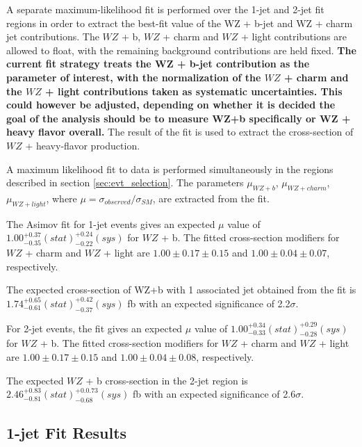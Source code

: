 
A separate maximum-likelihood fit is performed over the 1-jet and 2-jet fit regions in order to extract the best-fit value of the WZ + b-jet and WZ + charm jet contributions. The $WZ$ + b, $WZ$ + charm and $WZ$ + light contributions are allowed to float, with the remaining background contributions are held fixed. \textbf{The current fit strategy treats the WZ + b-jet contribution as the parameter of interest, with the normalization of the $WZ$ + charm and the $WZ$ + light contributions taken as systematic uncertainties. This could however be adjusted, depending on whether it is decided the goal of the analysis should be to measure WZ+b specifically or WZ + heavy flavor overall.} The result of the fit is used to extract the cross-section of $WZ$ + heavy-flavor production.

A maximum likelihood fit to data is performed simultaneously in the regions described in section \ref{sec:evt_selection}. The parameters $\mu_{WZ+b}$, $\mu_{WZ+charm}$, $\mu_{WZ+light}$, where $\mu = \sigma_{observed}/\sigma_{SM} $, are extracted from the fit.


The Asimov fit for 1-jet events gives an expected $\mu$ value of $1.00^{+0.37}_{-0.35}(stat)^{+0.24}_{-0.22}(sys)$ for $WZ$ + b. The fitted cross-section modifiers for $WZ$ + charm and $WZ$ + light are $1.00 \pm 0.17 \pm 0.15$ and $1.00 \pm 0.04 \pm 0.07 $, respectively.

The expected cross-section of WZ+b with 1 associated jet obtained from the fit is $1.74^{+0.65}_{-0.61}(stat)^{+0.42}_{-0.37}(sys)$ fb with an expected significance of 2.2$\sigma$.

For 2-jet events, the fit gives an expected $\mu$ value of $1.00^{+0.34}_{-0.33}(stat)^{+0.29}_{-0.28}(sys)$ for $WZ$ + b. The fitted cross-section modifiers for $WZ$ + charm and $WZ$ + light are $1.00 \pm 0.17 \pm 0.15$ and $1.00 \pm 0.04 \pm 0.08 $, respectively.

The expected $WZ$ + b cross-section in the 2-jet region is $2.46^{+0.83}_{-0.81}(stat)^{+0.0.73}_{-0.68}(sys)$ fb with an expected significance of 2.6$\sigma$.  

\subsection{1-jet Fit Results}

